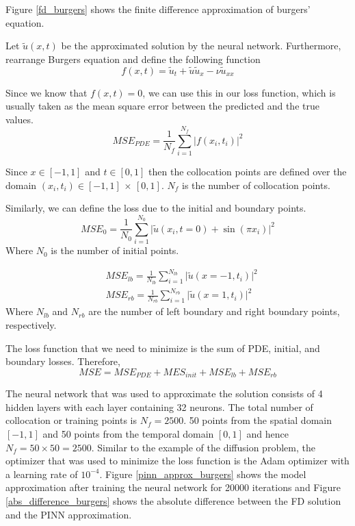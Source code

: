 \documentclass[a4paper,12pt]{article}
\theoremstyle{definition}
\begin{document}
Figure \ref{fd_burgers} shows the finite difference approximation of burgers' equation.

Let $\tilde{u}(x,t)$ be the approximated solution by the neural network. 
Furthermore, rearrange Burgers equation and define the following function
\begin{equation}
f(x,t) = \tilde{u}_t + \tilde{u} \tilde{u}_x - \nu \tilde{u}_{xx}
\end{equation}

Since we know that $f(x,t) = 0$, we can use this in our loss function, which is usually 
taken as the mean square error between the predicted and the true values.
\begin{equation}
MSE_{PDE} = \frac{1}{N_f} \sum_{i=1}^{N_f} \Big|f(x_i, t_i)\Big|^2
\end{equation}

Since $x\in [-1,1]$ and $t\in [0,1]$ then the collocation points are defined over 
the domain $(x_i, t_i) \in [-1,1] \, \times \, [0,1]$. $N_f$ is the number of collocation points.

Similarly, we can define the loss due to the initial and boundary points.
\begin{equation}
MSE_{0} = \frac{1}{N_0} \sum_{i=1}^{N_0} \Big| \tilde{u}(x_i, t=0) + \sin(\pi x_i)\Big|^2
\end{equation}
Where $N_0$ is the number of initial points.

\begin{equation}
\begin{aligned}
&MSE_{lb} = \frac{1}{N_{lb}} \sum_{i=1}^{N_{lb}} \Big| \tilde{u}(x=-1, t_i) \Big|^2 \\
&MSE_{rb} = \frac{1}{N_{rb}} \sum_{i=1}^{N_{rb}} \Big| \tilde{u}(x=1, t_i) \Big|^2
\end{aligned}
\end{equation}
Where $N_{lb}$ and $N_{rb}$ are the number of left boundary and right boundary points, respectively.

The loss function that we need to minimize is the sum of PDE, initial, and boundary losses. Therefore,
\begin{equation}
MSE = MSE_{PDE} + MES_{init} + MSE_{lb} + MSE_{rb}
\end{equation}

The neural network that was used to approximate the solution consists of 4 hidden layers
with each layer containing 32 neurons. The total number of collocation or training points is $N_f=2500$.
50 points from the spatial domain $[-1, 1]$ and 50 points from the temporal domain $[0, 1]$ and hence 
$N_f = 50 \times 50 = 2500$. Similar to the example of the diffusion problem, the optimizer that was used 
to minimize the loss function is the Adam optimizer with a learning rate of $10^{-4}$. Figure \ref{pinn_approx_burgers} 
shows the model approximation after training the neural network for 20000 iterations and Figure \ref{abs_difference_burgers}
shows the absolute difference between the FD solution and the PINN approximation.
\end{document}
